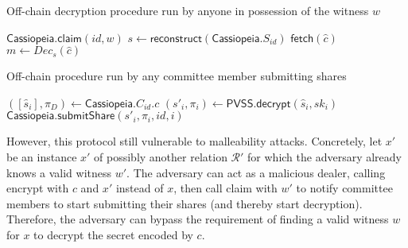 \begin{algorithm}[h]
    \caption{Off-chain decryption procedure run by anyone in possession of the witness $w$}
    \label{alg:decryption_no_incentives}
    \begin{algorithmic}[1]
            \State $\textsf{Cassiopeia.claim}(id, w)$
                \State $s \gets \textsf{reconstruct}(\textsf{Cassiopeia}.S_{id})$
                \State $\textsf{fetch}(\hat{c})$
                \State $m \gets Dec_s(\hat{c})$
            \EndOn
        \EndFunction
    \end{algorithmic}
\end{algorithm}

\begin{algorithm}[h]
    \caption{Off-chain procedure run by any committee member submitting shares}
\label{alg:committee_member_no_incentives}
    \begin{algorithmic}[1]
            \State $([\hat{s}_i], \pi_D) \gets \textsf{Cassiopeia}.C_{id}.c$
            \State $(s'_i, \pi_i) \gets \textsf{PVSS.decrypt}(\hat{s}_i, sk_i)$
            \State $\textsf{Cassiopeia.submitShare}(s'_i, \pi_i, id, i)$
        \EndOn
    \end{algorithmic}
\end{algorithm}

However, this protocol still vulnerable to malleability attacks.
Concretely, let $x'$ be an instance $x'$ of possibly another relation $\mathcal{R}'$ for which the adversary already knows a valid witness $w'$.
The adversary can act as a malicious dealer, calling \textsf{encrypt} with $c$ and $x'$ instead of $x$, then call \textsf{claim} with $w'$ to notify committee members to start submitting their shares (and thereby start decryption).
Therefore, the adversary can bypass the requirement of finding a valid witness $w$ for $x$ to decrypt the secret encoded by $c$.


